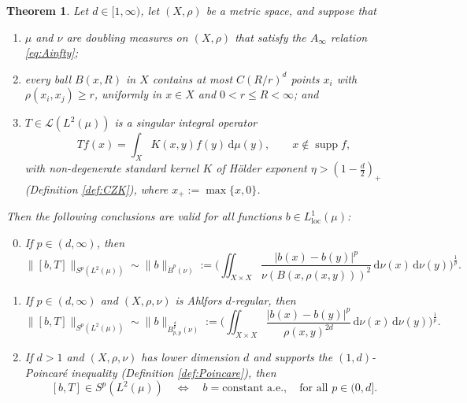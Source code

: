 \documentclass[reqno]{amsart}
\newcommand{\ud}[0]{\,\mathrm{d}}
\newcommand{\abs}[1]{|#1|}
\newcommand{\Norm}[2]{\|#1\|_{#2}}
\newcommand{\bddlin}[0]{\mathscr{L}}
\newcommand{\supp}[0]{\operatorname{supp}}
\newcommand{\loc}[0]{\operatorname{loc}}
\theoremstyle{plain}
\newtheorem{theorem}[equation]{Theorem}
\theoremstyle{definition}
\theoremstyle{remark}
\begin{document}
\begin{theorem}\label{thm:Sp-nu}
Let $d\in[1,\infty)$, let $(X,\rho)$ be a metric space, and suppose that
\begin{enumerate}[\rm(i)]
  \item\label{it:mu-nu} $\mu$ and $\nu$ are doubling measures on $(X,\rho)$ that satisfy the $A_\infty$ relation \eqref{eq:Ainfty};
  \item\label{it:sep-dim} every ball $B(x,R)$ in $X$ contains at most $C(R/r)^d$ points $x_i$ with $\rho(x_i,x_j)\geq r$, uniformly in $x\in X$ and $0<r\leq R<\infty$; and
  \item\label{it:CZ} $T\in\bddlin(L^2(\mu))$ is a singular integral operator
\begin{equation*}
  Tf(x)=\int_X K(x,y)f(y)\ud\mu(y),\qquad x\notin\supp f,
\end{equation*}
 with non-degenerate standard kernel $K$ of H\"older exponent $\eta>(1-\frac d2)_+$ (Definition \ref{def:CZK}), where $x_+:=\max\{x,0\}$.
\end{enumerate}
Then the following conclusions are valid for all functions $b\in L^1_{\loc}(\mu)$:
\begin{enumerate}[\rm(1)]\setcounter{enumi}{-1}
  \item\label{it:p>d} If $p\in(d,\infty)$, then
\begin{equation}\label{eq:p>d}
     \Norm{[b,T]}{S^p(L^2(\mu))}
     \sim
     \Norm{b}{\dot B^p(\nu)}:=\Big(\iint_{X\times X}\frac{\abs{b(x)-b(y)}^p}{\nu(B(x,\rho(x,y)))^2}
  \ud\nu(x)\ud\nu(y)\Big)^{\frac 1p}.
\end{equation}

    \item\label{it:p>dA} If $p\in(d,\infty)$ and $(X,\rho,\nu)$ is Ahlfors $d$-regular, then
\begin{equation*}
     \Norm{[b,T]}{S^p(L^2(\mu))}
    \sim\Norm{b}{\dot B^{\frac dp}_{p,p}(\nu)}:=\Big(\iint_{X\times X}\frac{\abs{b(x)-b(y)}^p}{\rho(x,y)^{2d}}
  \ud\nu(x)\ud\nu(y)\Big)^{\frac 1p}.
\end{equation*}

  \item\label{it:p<d} If $d>1$ and $(X,\rho,\nu)$ has lower dimension $d$ and supports the $(1,d)$-Poincar\'e inequality (Definition \ref{def:Poincare}), then
\begin{equation}\label{eq:b=const}
  [b,T]\in S^p(L^2(\mu))\quad\Leftrightarrow\quad b=\text{constant a.e.},\quad
  \text{for all }p\in(0,d].
\end{equation}


\end{enumerate}
\end{theorem}
\end{document}
